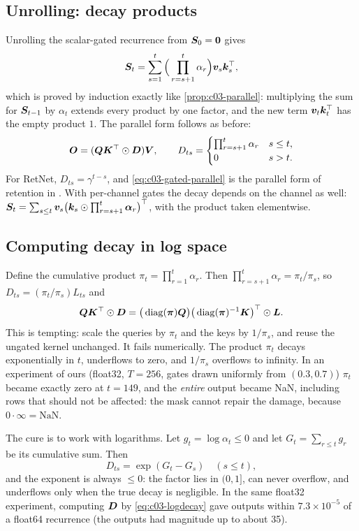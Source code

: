 \subsection{Unrolling: decay products}

Unrolling the scalar-gated recurrence from $\bm{S}_0=\bm 0$ gives
\begin{equation}\label{eq:c03-gated-unroll}
  \bm{S}_t=\sum_{s=1}^{t}\Big(\prod_{r=s+1}^{t}\alpha_r\Big)\bm{v}_s\bm{k}_s^{\top},
\end{equation}
which is proved by induction exactly like \cref{prop:c03-parallel}: multiplying the sum for
$\bm{S}_{t-1}$ by $\alpha_t$ extends every product by one factor, and the new term $\bm{v}_t\bm{k}_t^{\top}$
has the empty product $1$. The parallel form follows as before:
\begin{equation}\label{eq:c03-gated-parallel}
  \bm{O}=(\bm{Q}\bm{K}^{\top}\odot\bm{D})\bm{V},\qquad
  D_{ts}=\begin{cases}\prod_{r=s+1}^{t}\alpha_r & s\le t,\\ 0 & s>t.\end{cases}
\end{equation}
For RetNet, $D_{ts}=\gamma^{t-s}$, and \cref{eq:c03-gated-parallel} is the parallel form of
retention in \citet{sun2023retnet}. With per-channel gates the decay depends on the channel as well:
$\bm{S}_t=\sum_{s\le t}\bm{v}_s\big(\bm{k}_s\odot\prod_{r=s+1}^{t}\bm{\alpha}_r\big)^{\top}$, with the product taken
elementwise.

\subsection{Computing decay in log space}\label{sec:c03-logspace}

Define the cumulative product $\pi_t=\prod_{r=1}^{t}\alpha_r$. Then
$\prod_{r=s+1}^{t}\alpha_r=\pi_t/\pi_s$, so $D_{ts}=(\pi_t/\pi_s)L_{ts}$ and
\[
  \bm{Q}\bm{K}^{\top}\odot\bm{D}=\big(\operatorname{diag}(\bm{\pi})\bm{Q}\big)\big(\operatorname{diag}(\bm{\pi})^{-1}\bm{K}\big)^{\top}\odot\bm{L}.
\]
This is tempting: scale the queries by $\pi_t$ and the keys by $1/\pi_s$, and reuse the ungated
kernel unchanged. It fails numerically. The product $\pi_t$ decays exponentially in $t$, underflows
to zero, and $1/\pi_s$ overflows to infinity. In an experiment of ours (float32, $T=256$, gates
drawn uniformly from $(0.3,0.7)$) $\pi_t$ became exactly zero at $t=149$, and the \emph{entire}
output became NaN, including rows that should not be affected: the mask cannot repair the
damage, because $0\cdot\infty=\mathrm{NaN}$.

The cure is to work with logarithms. Let $g_t=\log\alpha_t\le0$ and let
$G_t=\sum_{r\le t}g_r$ be its cumulative sum. Then
\begin{equation}\label{eq:c03-logdecay}
  D_{ts}=\exp(G_t-G_s)\quad (s\le t),
\end{equation}
and the exponent is always $\le0$: the factor lies in $(0,1]$, can never overflow, and
underflows only when the true decay is negligible. In the same float32 experiment, computing
$\bm{D}$ by \cref{eq:c03-logdecay} gave outputs within $7.3\times10^{-5}$ of a float64 recurrence
(the outputs had magnitude up to about 35).

